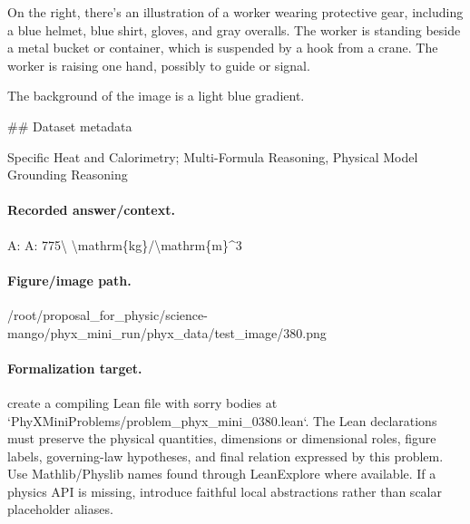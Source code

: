 On the right, there's an illustration of a worker wearing protective gear, including a blue helmet, blue shirt, gloves, and gray overalls. The worker is standing beside a metal bucket or container, which is suspended by a hook from a crane. The worker is raising one hand, possibly to guide or signal.

The background of the image is a light blue gradient.

\#\# Dataset metadata

Specific Heat and Calorimetry; Multi-Formula Reasoning, Physical Model Grounding Reasoning

\paragraph{Recorded answer/context.}
A: A: 775\textbackslash{} \textbackslash{}mathrm\{kg\}/\textbackslash{}mathrm\{m\}\textasciicircum{}3

\paragraph{Figure/image path.}
/root/proposal\_for\_physic/science-mango/phyx\_mini\_run/phyx\_data/test\_image/380.png

\paragraph{Formalization target.}
create a compiling Lean file with sorry bodies at `PhyXMiniProblems/problem\_phyx\_mini\_0380.lean`. The Lean declarations must preserve the physical quantities, dimensions or dimensional roles, figure labels, governing-law hypotheses, and final relation expressed by this problem.
Use Mathlib/Physlib names found through LeanExplore where available. If a physics API is missing, introduce faithful local abstractions rather than scalar placeholder aliases.

